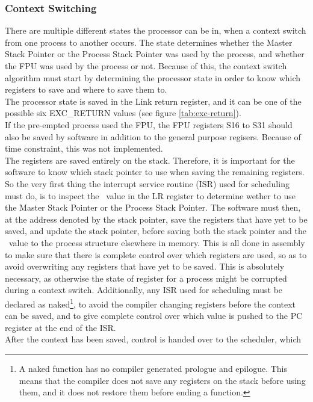 \subsubsection{Context Switching}
There are multiple different states the processor can be in, when a context
switch from one process to another occurs. The state determines whether the
Master Stack Pointer or the Process Stack Pointer was used by the process,
and whether the FPU was used by the process or not. Because of this, the context
switch algorithm must start by determining the processor state in order to know
which registers
to save and where to save them to.\\
The processor state is saved in the Link return register, and it can be one of
the possible six EXC\_RETURN values (see figure \ref{tab:exc-return}).\\
If the pre-empted process used the FPU, the FPU registers S16 to S31
should also be saved by software in addition to the general purpose regisers.
Because of time constraint, this was not implemented.\\
The registers are saved entirely on the stack. Therefore, it is important for
the software to know which
stack pointer to use when saving the remaining registers. So the very first
thing the interrupt service routine (ISR) used for scheduling must do, is to inspect
the \excreturn\ value in the LR register to determine wether to use the
Master Stack Pointer or the Process Stack Pointer. The software must then, at
the address denoted by the stack pointer, save the registers that have yet to be
saved, and update the stack pointer, before saving both the stack pointer and
the \excreturn\ value to the process structure elsewhere in memory. This is all
done in assembly to make sure that there is complete control over which
registers are used, so as to avoid overwriting any registers that have yet to be
saved. This is absolutely necessary, as otherwise the state of register for a
process might be corrupted during a context switch. Additionally, any ISR used
for scheduling must be declared as naked\footnote{A naked function has no
compiler generated prologue and epilogue. This means that the compiler does not
save any registers on the stack before using them, and it does not restore them
before ending a function.}, to avoid the compiler changing registers before the
context can be saved, and to give complete control over which value is pushed to
the PC register at the end of the ISR.\\
After the context has been saved, control is handed over to the scheduler, which
